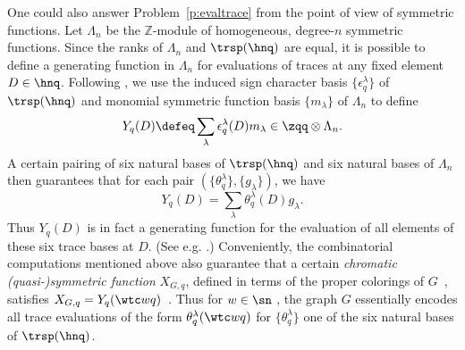 One could also answer Problem~\ref{p:evaltrace}
from the point of view of symmetric functions.
Let $\Lambda_n$ be the $\mathbb Z$-module of homogeneous, degree-$n$
symmetric functions.
Since the ranks of $\Lambda_n$ and $\trsp(\hnq)$ are
equal,
it is possible to define
a generating function in $\Lambda_n$
for evaluations of traces at
any fixed element $D \in \hnq$.
Following \cite[\S 2]{SkanCCS},
we use
the induced sign character basis $\{\epsilon_q^\lambda\}$ of $\trsp(\hnq)$
and monomial symmetric function basis $\{ m_\lambda \}$ of $\Lambda_n$
to define
\begin{equation*}
  Y_q(D) \defeq \sum_\lambda
  \epsilon_q^\lambda (D) m_\lambda \in \zqq \otimes \Lambda_n.
\end{equation*}
A certain pairing of six natural bases of $\trsp(\hnq)$
and six natural bases of $\Lambda_n$ then guarantees that for each pair
$(\{ \theta_q^\lambda \}, \{ g_\lambda \})$,
we have
\begin{equation*}
  Y_q(D) = \sum_\lambda \theta_q^\lambda(D) g_\lambda.
\end{equation*}
Thus $Y_q(D)$ is in fact a generating function for the evaluation
of all elements of these six trace bases
at $D$. (See e.g. \cite[Prop.\,2.1]{SkanCCS}.)
Conveniently, the combinatorial computations mentioned above also
guarantee
that a certain
{\em chromatic (quasi-)symmetric function}
$X_{G,q}$, defined in terms of the proper colorings of $G$~\cite{SWachsChromQ},
satisfies $X_{G,q} = Y_q(\wtc wq)$~\cite[Thm.\,7.4]{CHSSkanEKL}.
Thus for $w \in \sn$ \avoidingp,
the graph $G$ essentially encodes all trace evaluations of the
form $\theta_q^\lambda(\wtc wq)$ for $\{ \theta_q^\lambda \}$ one of the six natural
bases of $\trsp(\hnq)$.

